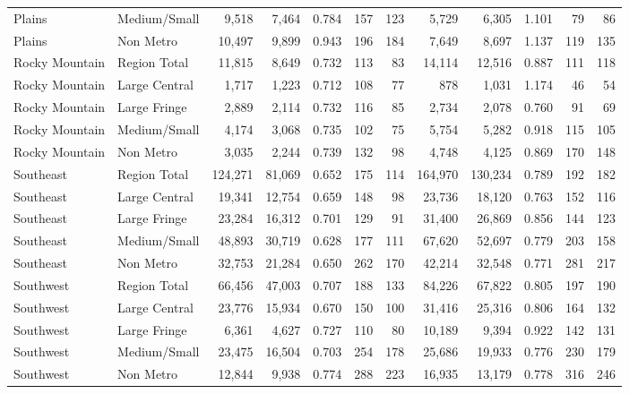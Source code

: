 \documentclass[
]{article}
\begin{document}
\begin{table}
\begin{tabular}[t]{llrrrrrrrrrr}
Plains & Medium/Small & 9,518 & 7,464 & 0.784 & 157 & 123 & 5,729 & 6,305 & 1.101 & 79 & 86\\
Plains & Non Metro & 10,497 & 9,899 & 0.943 & 196 & 184 & 7,649 & 8,697 & 1.137 & 119 & 135\\
\addlinespace[5pt]
Rocky Mountain & Region Total & 11,815 & 8,649 & 0.732 & 113 & 83 & 14,114 & 12,516 & 0.887 & 111 & 118\\
\addlinespace[2pt]
Rocky Mountain & Large Central & 1,717 & 1,223 & 0.712 & 108 & 77 & 878 & 1,031 & 1.174 & 46 & 54\\
Rocky Mountain & Large Fringe & 2,889 & 2,114 & 0.732 & 116 & 85 & 2,734 & 2,078 & 0.760 & 91 & 69\\
Rocky Mountain & Medium/Small & 4,174 & 3,068 & 0.735 & 102 & 75 & 5,754 & 5,282 & 0.918 & 115 & 105\\
Rocky Mountain & Non Metro & 3,035 & 2,244 & 0.739 & 132 & 98 & 4,748 & 4,125 & 0.869 & 170 & 148\\
\addlinespace[5pt]
Southeast & Region Total & 124,271 & 81,069 & 0.652 & 175 & 114 & 164,970 & 130,234 & 0.789 & 192 & 182\\
\addlinespace[2pt]
Southeast & Large Central & 19,341 & 12,754 & 0.659 & 148 & 98 & 23,736 & 18,120 & 0.763 & 152 & 116\\
Southeast & Large Fringe & 23,284 & 16,312 & 0.701 & 129 & 91 & 31,400 & 26,869 & 0.856 & 144 & 123\\
Southeast & Medium/Small & 48,893 & 30,719 & 0.628 & 177 & 111 & 67,620 & 52,697 & 0.779 & 203 & 158\\
Southeast & Non Metro & 32,753 & 21,284 & 0.650 & 262 & 170 & 42,214 & 32,548 & 0.771 & 281 & 217\\
\addlinespace[5pt]
Southwest & Region Total & 66,456 & 47,003 & 0.707 & 188 & 133 & 84,226 & 67,822 & 0.805 & 197 & 190\\
\addlinespace[2pt]
Southwest & Large Central & 23,776 & 15,934 & 0.670 & 150 & 100 & 31,416 & 25,316 & 0.806 & 164 & 132\\
Southwest & Large Fringe & 6,361 & 4,627 & 0.727 & 110 & 80 & 10,189 & 9,394 & 0.922 & 142 & 131\\
Southwest & Medium/Small & 23,475 & 16,504 & 0.703 & 254 & 178 & 25,686 & 19,933 & 0.776 & 230 & 179\\
Southwest & Non Metro & 12,844 & 9,938 & 0.774 & 288 & 223 & 16,935 & 13,179 & 0.778 & 316 & 246\\
\bottomrule
\end{tabular}
\end{table}
\end{document}
